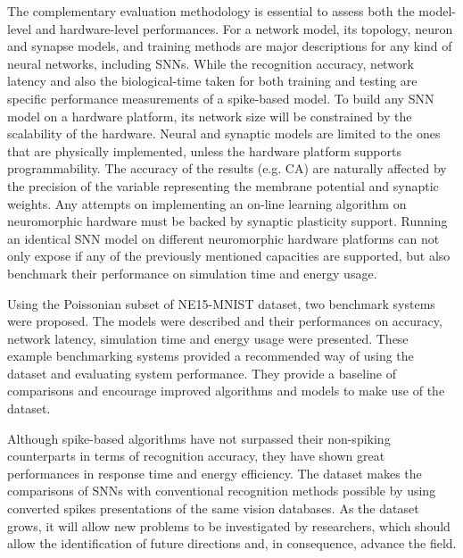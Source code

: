 The complementary evaluation methodology is essential to assess both the model-level and hardware-level performances.
For a network model, its topology, neuron and synapse models, and training methods are major descriptions for any kind of neural networks, including SNNs.
While the recognition accuracy, network latency and also the biological-time taken for both training and testing are specific performance measurements of a spike-based model.
To build any SNN model on a hardware platform, its network size will be constrained by the scalability of the hardware. Neural and synaptic models are limited to the ones that are physically implemented, unless the hardware platform supports programmability.
The accuracy of the results (e.g. CA) are naturally affected by the precision of the variable representing the membrane potential and synaptic weights.
Any attempts on implementing an on-line learning algorithm on neuromorphic hardware must be backed by synaptic plasticity support.
Running an identical SNN model on different neuromorphic hardware platforms can not only expose if any of the previously mentioned capacities are supported, but also benchmark their performance on simulation time and energy usage.

Using the Poissonian subset of NE15-MNIST dataset, two benchmark systems were proposed. 
The models were described and their performances on accuracy, network latency, simulation time and energy usage were presented.
These example benchmarking systems provided a recommended way of using the dataset and evaluating system performance.
They provide a baseline of comparisons and encourage improved algorithms and models to make use of the dataset.

Although spike-based algorithms have not surpassed their non-spiking counterparts in terms of recognition accuracy, they have shown great performances in response time and energy efficiency.
The dataset makes the comparisons of SNNs with conventional recognition methods possible by using converted spikes presentations of the same vision databases.
As the dataset grows, it will allow new problems to be investigated by researchers, which should allow the identification of future directions and, in consequence, advance the field.

